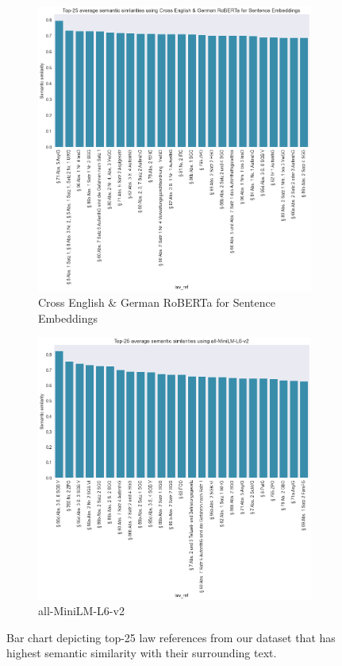 \documentclass[runningheads]{llncs}
\begin{document}
\begin{figure}[!h]
     \centering
     \begin{subfigure}[b]{0.49\textwidth}
         \centering
         \includegraphics[width=\textwidth]{images/ts_law_sim.png}
         \caption{Cross English \& German RoBERTa for Sentence Embeddings}
     \end{subfigure}
     \hfill
     \begin{subfigure}[b]{0.49\textwidth}
         \centering
         \includegraphics[width=\textwidth]{images/ml_law_sim.png}
         \caption{all-MiniLM-L6-v2}
     \end{subfigure}
    \caption{Bar chart depicting top-25 law references from our dataset that has highest semantic similarity with their surrounding text.}
    \label{fig:top-25-law-ref}
\end{figure}
\end{document}
